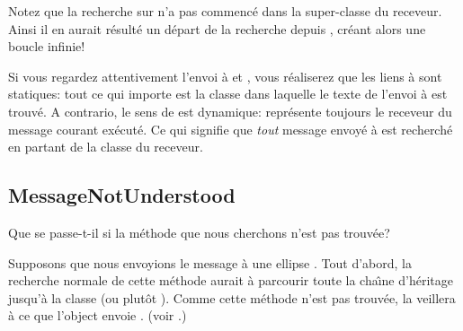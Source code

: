 \documentclass[a4paper,10pt,twoside]{book}
\begin{document}
Notez que la recherche sur \super n'a pas commenc\'e dans la 
super-classe du receveur. Ainsi il en aurait r\'esult\'e
un d\'epart de la recherche depuis , 
cr\'eant alors une boucle infinie!


Si vous regardez attentivement l'envoi \`a \super et , vous r\'ealiserez que les liens \`a \super sont statiques: tout ce qui importe
est la classe dans laquelle le texte de l'envoi \`a \super est trouv\'e.
A contrario, le sens de \self est dynamique: \self repr\'esente toujours le
receveur du message courant ex\'ecut\'e. Ce qui signifie que  \emph{tout} message envoy\'e \`a \self est recherch\'e en partant de la classe du receveur.

\subsection{MessageNotUnderstood}

Que se passe-t-il si la m\'ethode que nous cherchons n'est pas trouv\'ee?

Supposons que nous envoyions le message  \`a une ellipse .
Tout d'abord, la recherche normale de cette m\'ethode aurait \`a parcourir
toute la cha\^{\i}ne d'h\'eritage jusqu'\`a la classe  (ou
plut\^ot ).
Comme cette m\'ethode n'est pas trouv\'ee, la  veillera
\`a ce que l'object envoie .
(voir .)
\end{document}
